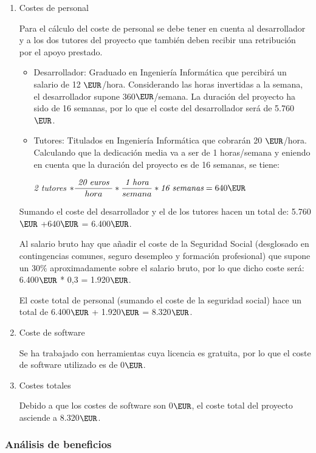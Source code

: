 \begin{enumerate}

\item Costes de personal

Para el cálculo del coste de personal se debe tener en cuenta al desarrollador y a los dos tutores del proyecto que también deben recibir una retribución por el apoyo prestado.

\begin{itemize}
\item Desarrollador: Graduado en Ingeniería Informática que percibirá un salario de 12 $\EUR$/hora. Considerando las horas invertidas a la semana, el desarrollador supone 360$\EUR$/semana. La duración del proyecto ha sido de 16 semanas, por lo que el coste del desarrollador será de 5.760$\EUR$.
\item Tutores: Titulados en Ingeniería Informática que cobrarán 20 $\EUR$/hora. Calculando que la dedicación media va a ser de 1 horas/semana y eniendo en cuenta que la duración del proyecto es de 16 semanas, se tiene:

\textit{2 tutores }$ * \dfrac{\textit{ 20 euros } }{hora}*\dfrac{\textit{1 hora}}{semana}*\textit{16 semanas}=640 \EUR $

\end{itemize}

Sumando el coste del desarrollador y el de los tutores hacen un total de:
5.760$\EUR$ +640$\EUR$ = 6.400$\EUR$.

Al salario bruto hay que añadir el coste de la Seguridad Social (desglosado en contingencias comunes, seguro desempleo y formación profesional) que supone un 30$\%$ aproximadamente sobre
el salario bruto, por lo que dicho coste será: 6.400$\EUR$ * 0,3 = 1.920$\EUR$.

El coste total de personal (sumando el coste de la seguridad social) hace un total de 6.400$\EUR$ + 1.920$\EUR$ = 8.320$\EUR$.

\item Coste de software

Se ha trabajado con herramientas cuya licencia es gratuita, por lo que el coste de software utilizado es de 0$\EUR$.

\item Costes totales

Debido a que los costes de software son 0$\EUR$, el coste total del proyecto asciende a 8.320$\EUR$.
\end{enumerate}

\subsubsection{Análisis de beneficios}

